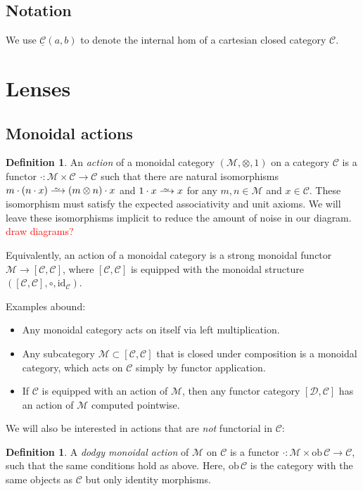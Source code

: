 \documentclass[11pt,a4paper]{amsart}
\theoremstyle{plain}
\theoremstyle{definition}
\newtheorem{definition}[theorem]{Definition}
\newcommand{\id}{\mathrm{id}}
\newcommand{\C}{\mathscr{C}}
\newcommand{\homC}{\underline{\C}}
\newcommand{\D}{\mathscr{D}}
\newcommand{\M}{\mathscr{M}}
\newcommand{\ob}{\mathrm{ob}\,}
\newcommand{\todo}[1]{\textcolor{red}{\small #1}}
\newcommand{\isoto}{\xrightarrow{
   \,\smash{\raisebox{-0.65ex}{\ensuremath{\scriptstyle\sim}}}\,}}
\begin{document}
\subsection{Notation}

We use $\homC(a,b)$ to denote the internal hom of a cartesian closed category $\C$.

\section{Lenses}

\subsection{Monoidal actions}

\begin{definition}
An \emph{action} of a monoidal category $(\M, \otimes, 1)$ on a category $\C$ is a functor $\cdot : \M \times \C \to \C$ such that there are natural isomorphisms $m \cdot (n \cdot x) \isoto (m \otimes n) \cdot x$ and $1 \cdot x \isoto x$ for any $m, n \in \M$ and $x \in \C$. These isomorphism must satisfy the expected associativity and unit axioms. We will leave these isomorphisms implicit to reduce the amount of noise in our diagram. \todo{draw diagrams?}

Equivalently, an action of a monoidal category is a strong monoidal functor $\M \to [\C, \C]$, where $[\C, \C]$ is equipped with the monoidal structure $([\C, \C], \circ, \id_\C)$.
\end{definition}

Examples abound: 
\begin{itemize} 
\item Any monoidal category acts on itself via left multiplication. 
\item Any subcategory $\M \subset [\C, \C]$ that is closed under composition is a monoidal category, which acts on $\C$ simply by functor application.
\item If $\C$ is equipped with an action of $\M$, then any functor category $[\D, \C]$ has an action of $\M$ computed pointwise.
\end{itemize}

We will also be interested in actions that are \emph{not} functorial in $\C$:

\begin{definition}
A \emph{dodgy monoidal action} of $\M$ on $\C$ is a functor $\cdot : \M \times \ob \C \to \C$, such that the same conditions hold as above. Here, $\ob \C$ is the category with the same objects as $\C$ but only identity morphisms.
\end{definition}
\end{document}
